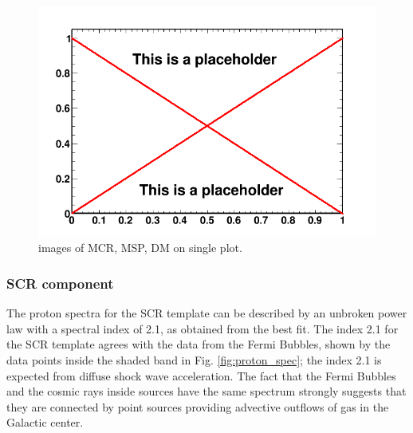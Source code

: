 \begin{figure}
 \centering
 \includegraphics[width=.9\linewidth]{pic/dummy.png}
 \caption{images of MCR, MSP, DM on single plot.}
 \label{fig:excess_component_comp}
\end{figure}

\subsubsection{SCR component}

The proton spectra for the SCR template can be described by an unbroken power law with a spectral index of 2.1, as obtained from the best fit. The index 2.1 for the SCR template agrees with the data from the Fermi Bubbles, shown by the data points inside the shaded band in Fig. \ref{fig:proton_spec}; the index 2.1 is expected from diffuse shock wave acceleration.  The fact that the Fermi Bubbles and the cosmic rays inside sources have the same spectrum strongly suggests that they are connected by point sources providing advective outflows of gas in the Galactic center. 


